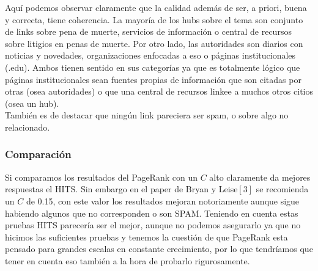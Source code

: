 

Aquí podemos observar claramente que la calidad además de ser, a priori, buena y correcta, tiene coherencia. La mayoría de los hubs sobre el tema son conjunto de links sobre pena de muerte, servicios de información o 
central de recursos sobre litigios en penas de muerte. Por otro lado, las autoridades son diarios con noticias y novedades, organizaciones enfocadas a eso o páginas institucionales (.edu). Ambos tienen sentido en sus 
categorías ya que es totalmente lógico que páginas institucionales sean fuentes propias de información que son citadas por otras (osea autoridades) o que una central de recursos linkee a muchos otros citios (osea un hub).\\
También es de destacar que ningún link pareciera ser spam, o sobre algo no relacionado.

\subsubsection{Comparación}

Si comparamos los resultados del PageRank con un $C$ alto claramente da mejores respuestas el HITS. Sin embargo en el paper de Bryan y Leise$[3]$ se recomienda un $C$ de 0.15, con este valor los resultados mejoran notoriamente aunque sigue habiendo algunos que no corresponden o son SPAM. 
Teniendo en cuenta estas pruebas HITS parecería ser el mejor, aunque no podemos asegurarlo ya que no hicimos las suficientes pruebas y tenemos la cuestión de que PageRank esta pensado para grandes escalas en constante crecimiento, por lo que tendríamos que tener en cuenta eso también a la hora de probarlo rigurosamente.
